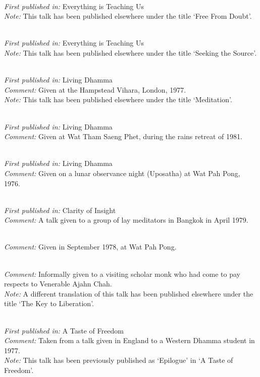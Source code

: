{ \\
\textit{First published in:} Everything is Teaching Us \\
\textit{Note:} This talk has been published elsewhere under the title `Free From Doubt'.

 \\
\textit{First published in:} Everything is Teaching Us \\
\textit{Note:} This talk has been published elsewhere under the title `Seeking the Source'.

 \\
\textit{First published in:} Living Dhamma \\
\textit{Comment:} Given at the Hampstead Vihara, London, 1977. \\
\textit{Note:} This talk has been published elsewhere under the title `Meditation'.

 \\
\textit{First published in:} Living Dhamma \\
\textit{Comment:} Given at Wat Tham Saeng Phet, during the rains retreat of 1981.

 \\
\textit{First published in:} Living Dhamma \\
\textit{Comment:} Given on a lunar observance night (Uposatha) at Wat Pah Pong, 1976.

 \\
\textit{First published in:} Clarity of Insight \\
\textit{Comment:} A talk given to a group of lay meditators in Bangkok in April 1979.

 \\
\textit{Comment:} Given in September 1978, at Wat Pah Pong.

 \\
\textit{Comment:} Informally given to a visiting scholar monk who had come to pay respects to Venerable Ajahn Chah. \\
\textit{Note:} A different translation of this talk has been published elsewhere under the title `The Key to Liberation'.

 \\
\textit{First published in:} A Taste of Freedom \\
\textit{Comment:} Taken from a talk given in England to a Western Dhamma student in 1977. \\
\textit{Note:} This talk has been previously published as `Epilogue' in `A Taste of Freedom'.

}
